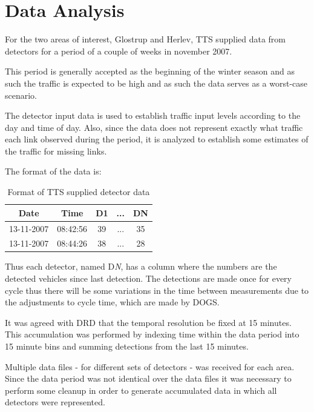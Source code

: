 \section{Data Analysis}
\label{data}
For the two areas of interest, Glostrup and Herlev, TTS supplied data from detectors for a period of a couple of weeks in november 2007.

This period is generally accepted as the beginning of the winter season and as such the traffic is expected to be high and as such the data serves as a worst-case scenario.

The detector input data is used to establish traffic input levels according to the day and time of day. Also, since the data does not represent exactly what traffic each link observed during the period, it is analyzed to establish some estimates of the traffic for missing links.

The format of the data is:

\begin{table}[!ht]
\begin{center}
\begin{tabular}{c|c|c|c|c}
\textbf{Date} & \textbf{Time} & \textbf{D1} & \textbf{...} & \textbf{DN} \\ \hline
13-11-2007 & 08:42:56 & 39 & ... & 35 \\
13-11-2007 & 08:44:26 & 38 & ...  & 28 \\
\end{tabular}
\end{center}
\caption{Format of TTS supplied detector data}
\label{tab:dataformat}
\end{table}

Thus each detector, named D\textit{N}, has a column where the numbers are the detected vehicles since last detection. The detections are made once for every cycle thus there will be some variations in the time between measurements due to the adjustments to cycle time, which are made by DOGS.

It was agreed with DRD that the temporal resolution be fixed at 15 minutes. This accumulation was performed by indexing time within the data period into 15 minute bins and summing detections from the last 15 minutes.

Multiple data files - for different sets of detectors - was received for each area. Since the data period was not identical over the data files it was necessary to perform some cleanup in order to generate accumulated data in which all detectors were represented.

